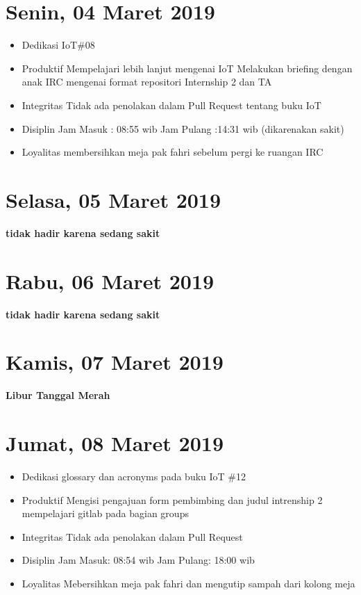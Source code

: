 \section{Senin, 04 Maret 2019}
\begin{itemize}
\item Dedikasi
\subitem IoT\#08
\item Produktif
  \subitem Mempelajari lebih lanjut mengenai IoT
  \subitem Melakukan briefing dengan anak IRC mengenai format repositori Internship 2 dan TA
\item Integritas
  \subitem Tidak ada penolakan dalam Pull Request tentang buku IoT
\item Disiplin
  \subitem Jam Masuk : 08:55 wib
  \subitem Jam Pulang :14:31 wib (dikarenakan sakit)
\item Loyalitas
  \subitem membersihkan meja pak fahri sebelum pergi ke ruangan IRC
\end{itemize}

\section{Selasa, 05 Maret 2019}
\textbf{tidak hadir karena sedang sakit}

\section{Rabu, 06 Maret 2019}
\textbf{tidak hadir karena sedang sakit}

\section{Kamis, 07 Maret 2019}
\textbf{Libur Tanggal Merah}

\section{Jumat, 08 Maret 2019}
\begin{itemize}
\item Dedikasi
  \subitem glossary dan acronyms pada buku IoT \#12
\item Produktif
  \subitem Mengisi pengajuan form pembimbing dan judul intrenship 2
  \subitem mempelajari gitlab pada bagian groups
\item Integritas
  \subitem Tidak ada penolakan dalam Pull Request
\item Disiplin
  \subitem Jam Masuk:  08:54 wib
  \subitem Jam Pulang: 18:00 wib
\item Loyalitas
  \subitem Mebersihkan meja pak fahri dan mengutip sampah dari kolong meja
\end{itemize}


